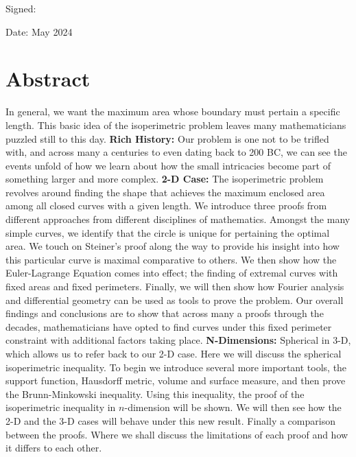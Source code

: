 \documentclass[a4paper]{book}
\numberwithin{theorem}{section}%
\begin{document}
\bigskip

\noindent
Signed: 


\bigskip

\noindent
Date: May 2024

\chapter*{Abstract}
In general, we want the maximum area whose boundary must pertain a specific length. This basic idea of the isoperimetric problem leaves many mathematicians puzzled still to this day.
\newline
\newline
\textbf{Rich History:} Our problem is one not to be trifled with, and across many a centuries to even dating back to 200 BC, we can see the events unfold of how we learn about how the small intricacies become part of something larger and more complex. 
\newline
\newline
\textbf{2-D Case:} The isoperimetric problem revolves around finding the shape that achieves the maximum enclosed area among all closed curves with a given length. We introduce three proofs from different approaches from different disciplines of mathematics. Amongst the many simple curves, we identify that the circle is unique for pertaining the optimal area. We touch on Steiner's proof along the way to provide his insight into how this particular curve is maximal comparative to others. We then show how the Euler-Lagrange Equation comes into effect; the finding of extremal curves with fixed areas and fixed perimeters. Finally, we will then show how Fourier analysis and differential geometry can be used as tools to prove the problem. Our overall findings and conclusions are to show that across many a proofs through the decades, mathematicians have opted to find curves under this fixed perimeter constraint with additional factors taking place. 
\newline
\newline
\textbf{N-Dimensions:} Spherical in 3-D, which allows us to refer back to our 2-D case. Here we will discuss the spherical isoperimetric inequality. To begin we introduce several more important tools, the support function, Hausdorff metric, volume and surface measure, and then prove the Brunn-Minkowski inequality. Using this inequality, the proof of the isoperimetric inequality in $n$-dimension will be shown. We will then see how the 2-D and the 3-D cases will behave under this new result.
\newline
\newline
Finally a comparison between the proofs. Where we shall discuss the limitations of each proof and how it differs to each other.
\end{document}
